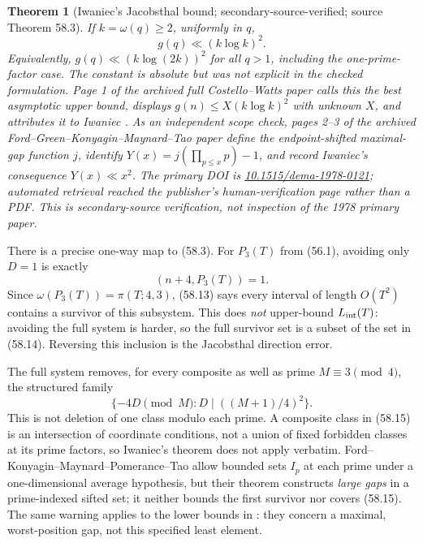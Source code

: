 \documentclass[10pt,reqno]{amsart}
\newtheorem{theorem}{Theorem}[section]
\theoremstyle{definition}
\newcommand{\1}{\mathbf 1}
\begin{document}
\begin{theorem}[Iwaniec's Jacobsthal bound; secondary-source-verified;
source Theorem 58.3]\label{thm:jacobsthal}
If $k=\omega(q)\geq2$, uniformly in $q$,
\begin{equation}\tag{58.13}
                              g(q)\ll(k\log k)^2.
\end{equation}
Equivalently, $g(q)\ll(k\log(2k))^2$ for all $q>1$, including the
one-prime-factor case.  The constant is absolute but was not explicit in the
checked formulation.  Page 1 of the archived full Costello--Watts paper
\cite{CostelloWatts} calls this the best \emph{asymptotic} upper bound,
displays $g(n)\leq X(k\log k)^2$ with unknown $X$, and attributes it to
Iwaniec \cite{IwaniecJacobsthal}.  As an independent scope check, pages 2--3
of the archived Ford--Green--Konyagin--Maynard--Tao paper
\cite{FordGreenKonyaginMaynardTao} define the endpoint-shifted maximal-gap
function $j$, identify $Y(x)=j(\prod_{p\leq x}p)-1$, and record Iwaniec's
consequence $Y(x)\ll x^2$.  The primary DOI is
\href{https://doi.org/10.1515/dema-1978-0121}{10.1515/dema-1978-0121};
automated retrieval reached the publisher's human-verification page rather
than a PDF.  This is secondary-source verification, not inspection of the
1978 primary paper.
\end{theorem}

There is a precise one-way map to (58.3).  For $P_3(T)$ from (56.1), avoiding
only $D=1$ is exactly
\begin{equation}\tag{58.14}
                         (n+4,P_3(T))=1.
\end{equation}
Since $\omega(P_3(T))=\pi(T;4,3)$, (58.13) says every interval of length
$O(T^2)$ contains a survivor of this subsystem.  This does \emph{not}
upper-bound $L_{\rm int}(T)$: avoiding the full system is harder, so the
full survivor set is a subset of the set in (58.14).  Reversing this
inclusion is the Jacobsthal direction error.

The full system removes, for every composite as well as prime
$M\equiv3\pmod4$, the structured family
\begin{equation}\tag{58.15}
 \{-4D\pmod M:D\mid((M+1)/4)^2\}.
\end{equation}
This is not deletion of one class modulo each prime.  A composite class in
(58.15) is an intersection of coordinate conditions, not a union of fixed
forbidden classes at its prime factors, so Iwaniec's theorem does not apply
verbatim.  Ford--Konyagin--Maynard--Pomerance--Tao
\cite{FordKonyaginMaynardPomeranceTao} allow bounded sets $I_p$ at each
prime under a one-dimensional average hypothesis, but their theorem
constructs \emph{large gaps} in a prime-indexed sifted set; it neither bounds
the first survivor nor covers (58.15).  The same warning applies to the
lower bounds in \cite{FordGreenKonyaginMaynardTao}: they concern a maximal,
worst-position gap, not this specified least element.
\end{document}
